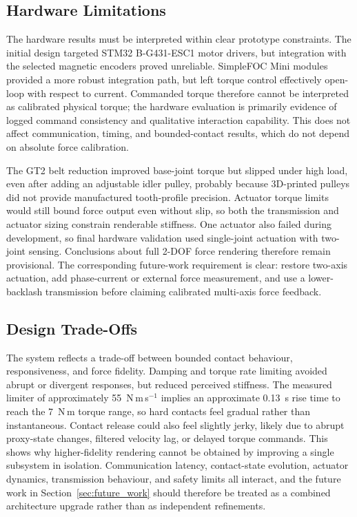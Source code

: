 \subsection{Hardware Limitations} \label{sec:discussion_hardware_limitations}
The hardware results must be interpreted within clear prototype constraints. The initial design targeted STM32 B-G431-ESC1 motor drivers, but integration with the selected magnetic encoders proved unreliable. SimpleFOC Mini modules provided a more robust integration path, but left torque control effectively open-loop with respect to current. Commanded torque therefore cannot be interpreted as calibrated physical torque; the hardware evaluation is primarily evidence of logged command consistency and qualitative interaction capability. This does not affect communication, timing, and bounded-contact results, which do not depend on absolute force calibration.

The GT2 belt reduction improved base-joint torque but slipped under high load, even after adding an adjustable idler pulley, probably because 3D-printed pulleys did not provide manufactured tooth-profile precision. Actuator torque limits would still bound force output even without slip, so both the transmission and actuator sizing constrain renderable stiffness. One actuator also failed during development, so final hardware validation used single-joint actuation with two-joint sensing. Conclusions about full 2-DOF force rendering therefore remain provisional. The corresponding future-work requirement is clear: restore two-axis actuation, add phase-current or external force measurement, and use a lower-backlash transmission before claiming calibrated multi-axis force feedback.

\subsection{Design Trade-Offs} \label{sec:discussion_design_tradeoffs}
The system reflects a trade-off between bounded contact behaviour, responsiveness, and force fidelity. Damping and torque rate limiting avoided abrupt or divergent responses, but reduced perceived stiffness. The measured limiter of approximately 55~N\,m\,s$^{-1}$ implies an approximate 0.13~s rise time to reach the 7~N\,m torque range, so hard contacts feel gradual rather than instantaneous. Contact release could also feel slightly jerky, likely due to abrupt proxy-state changes, filtered velocity lag, or delayed torque commands. This shows why higher-fidelity rendering cannot be obtained by improving a single subsystem in isolation. Communication latency, contact-state evolution, actuator dynamics, transmission behaviour, and safety limits all interact, and the future work in Section~\ref{sec:future_work} should therefore be treated as a combined architecture upgrade rather than as independent refinements.

